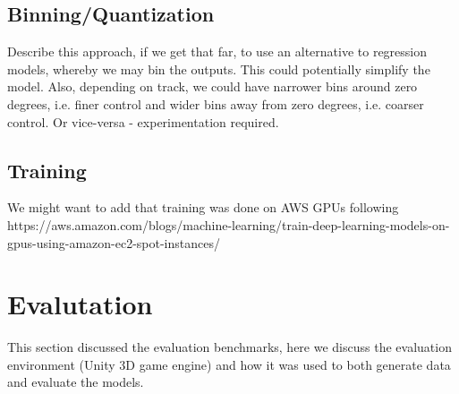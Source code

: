 \subsection{Binning/Quantization}
Describe this approach, if we get that far, to use an alternative to regression models, whereby we may bin the outputs. This could potentially simplify the model. Also, depending on track, we could have narrower bins around zero degrees, i.e. finer control and wider bins away from zero degrees, i.e. coarser control. Or vice-versa - experimentation required.

\subsection{Training}

We might want to add that training was done on AWS GPUs following   
https://aws.amazon.com/blogs/machine-learning/train-deep-learning-models-on-gpus-using-amazon-ec2-spot-instances/  


\section{Evalutation}
This section discussed the evaluation benchmarks, here we discuss the evaluation environment (Unity 3D game engine) and how it was used to both generate data and evaluate the models.



